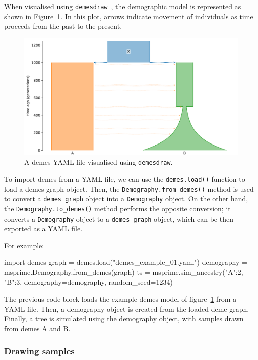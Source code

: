 \documentclass[graybox]{svmult}
\begin{document}
When visualised using \texttt{demesdraw}~\citep{gower_grahamgowerdemesdraw_2024},
the demographic model is represented as shown in Figure~\ref{fig-demes-plot}.
 In this plot, arrows indicate movement of individuals as time proceeds from
the past to the present.

\begin{figure}[t]
\centering
\includegraphics[width=\textwidth]{images/demes.pdf}
\caption{\label{fig-demes-plot}A demes YAML file visualised using \texttt{demesdraw}.}
\end{figure}

To import demes from a YAML file, we can use the \texttt{demes.load()} function to
load a demes graph object. Then, the \texttt{Demography.from\_demes()} method is used to convert a
\texttt{demes graph} object into a \texttt{Demography} object. On the
other hand, the \texttt{Demography.to\_demes()} method performs the opposite conversion; it
converts a \texttt{Demography} object to a \texttt{demes graph} object, which can be then
exported as a YAML file.

For example:

\begin{pythoncode}
import demes
graph = demes.load("demes_example_01.yaml")
demography = msprime.Demography.from_demes(graph)
ts = msprime.sim_ancestry({"A":2, "B":3},
             demography=demography, random_seed=1234)
\end{pythoncode}

The previous code block loads the example demes model of figure~\ref{fig-demes-plot} from a YAML file. Then, a demography
object is created from the loaded deme graph. Finally, a tree is simulated using the demography object, with samples
drawn from demes A and B.


\subsubsection{Drawing samples}\label{ancient-samples}
\end{document}
